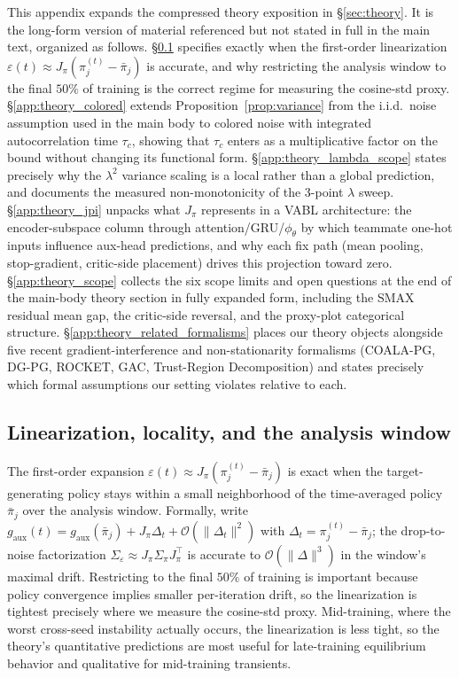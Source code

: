 \documentclass{article}
\theoremstyle{plain}
\theoremstyle{definition}
\theoremstyle{remark}
\begin{document}
This appendix expands the compressed theory exposition in
\S\ref{sec:theory}. It is the long-form version of material
referenced but not stated in full in the main text, organized as
follows.
\S\ref{app:theory_linearization} specifies exactly when the
first-order linearization $\varepsilon(t) \approx J_\pi
(\pi_j^{(t)} - \bar\pi_j)$ is accurate, and why restricting the
analysis window to the final $50\%$ of training is the correct
regime for measuring the cosine-std proxy.
\S\ref{app:theory_colored} extends Proposition~\ref{prop:variance}
from the i.i.d.\ noise assumption used in the main body to colored
noise with integrated autocorrelation time $\tau_c$, showing that
$\tau_c$ enters as a multiplicative factor on the bound without
changing its functional form.
\S\ref{app:theory_lambda_scope} states precisely why the
$\lambda^2$ variance scaling is a local rather than a global
prediction, and documents the measured non-monotonicity of the
3-point $\lambda$ sweep.
\S\ref{app:theory_jpi} unpacks what $J_\pi$ represents in a VABL
architecture: the encoder-subspace column through
attention/GRU/$\phi_\theta$ by which teammate one-hot inputs
influence aux-head predictions, and why each fix path (mean
pooling, stop-gradient, critic-side placement) drives this
projection toward zero.
\S\ref{app:theory_scope} collects the six scope limits and open
questions at the end of the main-body theory section in fully
expanded form, including the SMAX residual mean gap, the
critic-side reversal, and the proxy-plot categorical structure.
\S\ref{app:theory_related_formalisms} places our theory objects
alongside five recent gradient-interference and non-stationarity
formalisms (COALA-PG, DG-PG, ROCKET, GAC, Trust-Region
Decomposition) and states precisely which formal assumptions our
setting violates relative to each.

\subsection{Linearization, locality, and the analysis window}
\label{app:theory_linearization}

The first-order expansion $\varepsilon(t) \approx J_\pi (\pi_j^{(t)}
- \bar\pi_j)$ is exact when the target-generating policy stays
within a small neighborhood of the time-averaged policy $\bar\pi_j$
over the analysis window. Formally, write $g_{\mathrm{aux}}(t) =
g_{\mathrm{aux}}(\bar\pi_j) + J_\pi \Delta_t +
\mathcal{O}(\|\Delta_t\|^2)$ with $\Delta_t = \pi_j^{(t)} -
\bar\pi_j$; the drop-to-noise factorization
$\Sigma_\varepsilon \approx J_\pi \Sigma_\pi J_\pi^\top$ is
accurate to $\mathcal{O}(\|\Delta\|^3)$ in the window's maximal
drift. Restricting to the final $50\%$ of training is important
because policy convergence implies smaller per-iteration drift, so
the linearization is tightest precisely where we measure the
cosine-std proxy. Mid-training, where the worst cross-seed
instability actually occurs, the linearization is less tight, so
the theory's quantitative predictions are most useful for
late-training equilibrium behavior and qualitative for mid-training
transients.
\end{document}
